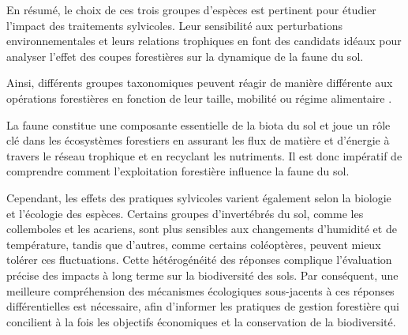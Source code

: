 En résumé, le choix de ces trois groupes d'espèces est pertinent pour étudier l'impact des traitements sylvicoles. 
Leur sensibilité aux perturbations environnementales et leurs relations trophiques en font des candidats idéaux pour analyser l'effet des coupes forestières sur la dynamique de la faune du sol.


Ainsi, différents groupes taxonomiques peuvent réagir de manière différente aux opérations forestières en fonction de leur taille, mobilité ou régime alimentaire \citep{Barlow2007Quantifyingbiodiversity,Stork2009Vulnerabilityresilience}.


La faune constitue une composante essentielle de la biota du sol et joue un rôle clé dans les écosystèmes forestiers en assurant les flux de matière et d'énergie à travers le réseau trophique et en recyclant les nutriments. 
Il est donc impératif de comprendre comment l'exploitation forestière influence la faune du sol.





 \citep{Kudrin2023metaanalysiseffects}

Cependant, les effets des pratiques sylvicoles varient également selon la biologie et l'écologie des espèces. 
Certains groupes d’invertébrés du sol, comme les collemboles et les acariens, sont plus sensibles aux changements d'humidité et de température, tandis que d'autres, comme certains coléoptères, peuvent mieux tolérer ces fluctuations. 
Cette hétérogénéité des réponses complique l'évaluation précise des impacts à long terme sur la biodiversité des sols. 
Par conséquent, une meilleure compréhension des mécanismes écologiques sous-jacents à ces réponses différentielles est nécessaire, afin d'informer les pratiques de gestion forestière qui concilient à la fois les objectifs économiques et la conservation de la biodiversité.





